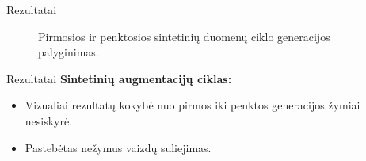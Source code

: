 \documentclass{beamer}
\begin{document}
\begin{frame}{Rezultatai}
    \begin{figure}[!htbp]
        \hfill
        \caption{Pirmosios ir penktosios sintetinių duomenų ciklo generacijos palyginimas.}
        \label{fig:comparison_generations}
    \end{figure}
\end{frame}




\begin{frame}{Rezultatai}
   \textbf{Sintetinių augmentacijų ciklas:}
        \begin{itemize}
            \item Vizualiai rezultatų kokybė nuo pirmos iki penktos generacijos žymiai nesiskyrė.
            \item Pastebėtas nežymus vaizdų suliejimas.
        \end{itemize}
\end{frame}
\end{document}
